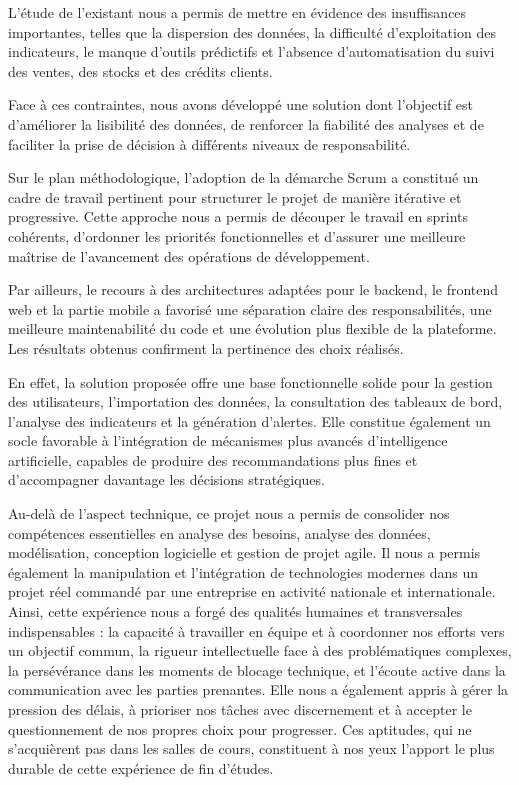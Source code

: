 \documentclass[a4paper,12pt]{report}
\begin{document}
L'étude de l'existant nous a permis de mettre en évidence des insuffisances importantes, telles que la dispersion des données, la difficulté d'exploitation des indicateurs, le manque d'outils prédictifs et l'absence d'automatisation du suivi des ventes, des stocks et des crédits clients.

Face à ces contraintes, nous avons développé une solution dont l'objectif est d'améliorer la lisibilité des données, de renforcer la fiabilité des analyses et de faciliter la prise de décision à différents niveaux de responsabilité.

Sur le plan méthodologique, l'adoption de la démarche Scrum a constitué un cadre de travail pertinent pour structurer le projet de manière itérative et progressive. Cette approche nous a permis de découper le travail en sprints cohérents, d'ordonner les priorités fonctionnelles et d'assurer une meilleure maîtrise de l'avancement des opérations de développement.

Par ailleurs, le recours à des architectures adaptées pour le backend, le frontend web et la partie mobile a favorisé une séparation claire des responsabilités, une meilleure maintenabilité du code et une évolution plus flexible de la plateforme. Les résultats obtenus confirment la pertinence des choix réalisés.

En effet, la solution proposée offre une base fonctionnelle solide pour la gestion des utilisateurs, l'importation des données, la consultation des tableaux de bord, l'analyse des indicateurs et la génération d'alertes. Elle constitue également un socle favorable à l'intégration de mécanismes plus avancés d'intelligence artificielle, capables de produire des recommandations plus fines et d'accompagner davantage les décisions stratégiques.

Au-delà de l'aspect technique, ce projet nous a permis de consolider nos compétences essentielles en analyse des besoins, analyse des données, modélisation, conception logicielle et gestion de projet agile. Il nous a permis également la manipulation et l'intégration de technologies modernes dans un projet réel commandé par une entreprise en activité nationale et internationale. Ainsi, cette expérience nous a forgé des qualités humaines et transversales indispensables : la capacité à travailler en équipe et à coordonner nos efforts vers un objectif commun, la rigueur intellectuelle face à des problématiques complexes, la persévérance dans les moments de blocage technique, et l'écoute active dans la communication avec les parties prenantes. Elle nous a également appris à gérer la pression des délais, à prioriser nos tâches avec discernement et à accepter le questionnement de nos propres choix pour progresser. Ces aptitudes, qui ne s'acquièrent pas dans les salles de cours, constituent à nos yeux l'apport le plus durable de cette expérience de fin d'études.
\end{document}
